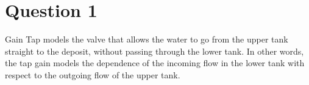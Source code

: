 \section{Question 1}

Gain Tap models the valve that allows the water to go from the upper tank
straight to the deposit, without passing through the lower tank. In other words,
the tap gain models the dependence of the incoming flow in the lower tank with
respect to the outgoing flow of the upper tank.

